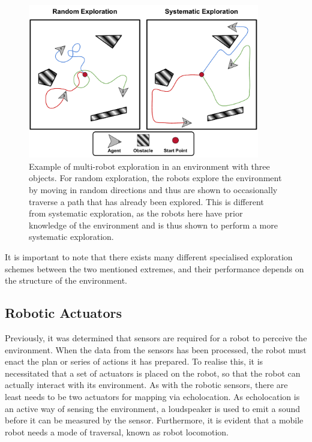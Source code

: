 \begin{figure}[H]
    \centering
    \includegraphics[width=0.9\textwidth]{figures/1Problem_analysis/Exploration Schemes.pdf}
    \caption{Example of multi-robot exploration in an environment with three objects. For random exploration, the robots explore the environment by moving in random directions and thus are shown to occasionally traverse a path that has already been explored. This is different from systematic exploration, as the robots here have prior knowledge of the environment and is thus shown to perform a more systematic exploration.} 
    \label{fig:exploration_schemes}
\end{figure}

It is important to note that there exists many different specialised exploration schemes between the two mentioned extremes, and their performance depends on the structure of the environment. \cite{PathPlanning:FundamentalSwarm}


\subsection{Robotic Actuators}\label{subsec:RoboticActuators}
Previously, it was determined that sensors are required for a robot to perceive the environment. When the data from the sensors has been processed, the robot must enact the plan or series of actions it has prepared. To realise this, it is necessitated that a set of actuators is placed on the robot, so that the robot can actually interact with its environment. As with the robotic sensors, there are least needs to be two actuators for mapping via echolocation. As echolocation is an active way of sensing the environment, a loudspeaker is used to emit a sound before it can be measured by the sensor. Furthermore, it is evident that a mobile robot needs a mode of traversal, known as robot locomotion.


